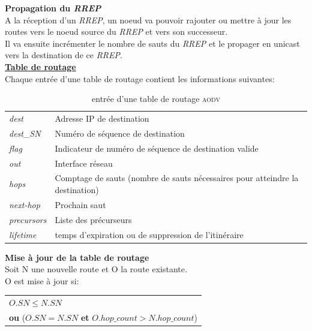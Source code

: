 \documentclass[a4paper, 12pt]{report}
\newcommand{\aodv}{\textsc{aodv}}
\begin{document}
        \textbf{Propagation du \textit{RREP}}\\
            A la réception d'un \textit{RREP}, un noeud va pouvoir rajouter ou mettre à jour
            les routes vers le noeud source du \textit{RREP} et vers son successeur.\\
            Il va ensuite incrémenter le nombre de sauts du \textit{RREP} et le propager en unicast vers la destination de ce \textit{RREP}.\\

        \underline{\textbf{Table de routage}}\\
        
        Chaque entrée d'une table de routage contient les informations suivantes:
        
        \begin{table}[H]
            \centering
            \begin{tabular}{|l|l|}
                \hline
                \textit{dest}       & Adresse IP de destination\\
                \textit{dest\_SN}   & Numéro de séquence de destination\\
                \textit{flag}       & Indicateur de numéro de séquence de destination valide\\
                \textit{out}        & Interface réseau\\
                \textit{hops}       & Comptage de sauts (nombre de sauts nécessaires pour atteindre la destination)\\
                \textit{next-hop}   & Prochain saut\\
                \textit{precursors} & Liste des précurseurs\\
                \textit{lifetime}   & temps d'expiration ou de suppression de l'itinéraire\\
                \hline
            \end{tabular}
            \caption{entrée d'une table de routage \aodv \cite{aodv_w}}
            \label{routingTable_aodv}
        \end{table}

        \textbf{Mise à jour de la table de routage}\\
            Soit N une nouvelle route et O la route existante.\\
            O est mise à jour si:\\
            \begin{center}
                \begin{tabular}{|l|}
                    \hline
                    $O.SN \leq N.SN$ \\
                    \textbf{ou} ($O.SN = N.SN$ \textbf{et} $O.hop\_count > N.hop\_count$)\\
                    \hline
                \end{tabular}
            \end{center}
        
\end{document}
